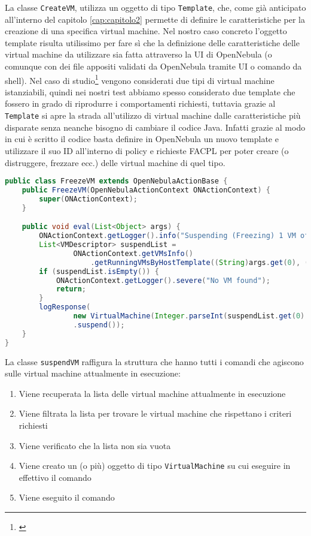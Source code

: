 La classe \texttt{CreateVM}, utilizza un oggetto di tipo \texttt{Template}, che, come già anticipato all'interno del capitolo \ref{cap:capitolo2} permette di definire le caratteristiche per la creazione di una specifica virtual machine. Nel nostro caso concreto l'oggetto template risulta utilissimo per fare sì che la definizione delle caratteristiche delle virtual machine da utilizzare sia fatta attraverso la UI di OpenNebula (o comunque con dei file appositi validati da OpenNebula tramite UI o comando da shell). Nel caso di studio\footnote{\cite{10.1007/978-3-319-08260-8_6}} vengono considerati due tipi di virtual machine istanziabili, quindi nei nostri test abbiamo spesso considerato due template che fossero in grado di riprodurre i comportamenti richiesti, tuttavia grazie al \texttt{Template} si apre la strada all'utilizzo di virtual machine dalle caratteristiche più disparate senza neanche bisogno di cambiare il codice Java. Infatti grazie al modo in cui è scritto il codice basta definire in OpenNebula un nuovo template e utilizzare il suo ID all'interno di policy e richieste FACPL per poter creare (o distruggere, frezzare ecc.) delle virtual machine di quel tipo.
\begin{lstlisting}[language=Java, caption=Classe per freezzare(sospendere) una \texttt{VirtualMachine}, label=code:FreezeVM, basicstyle=\fontsize{8.5}{9.5}\ttfamily]
public class FreezeVM extends OpenNebulaActionBase {
    public FreezeVM(OpenNebulaActionContext ONActionContext) {
        super(ONActionContext);
    }

    public void eval(List<Object> args) {
        ONActionContext.getLogger().info("Suspending (Freezing) 1 VM of [host, template]: " + "[" + args.get(0) + " " + args.get(2) + "]");
        List<VMDescriptor> suspendList = 
                ONActionContext.getVMsInfo()
                    .getRunningVMsByHostTemplate((String)args.get(0), (String)args.get(2));
        if (suspendList.isEmpty()) {
            ONActionContext.getLogger().severe("No VM found");
            return;
        }
        logResponse(
                new VirtualMachine(Integer.parseInt(suspendList.get(0).getVmId()), ONActionContext.getClient())
                .suspend());
    }
}
\end{lstlisting}
La classe \texttt{suspendVM} raffigura la struttura che hanno tutti i comandi che agiscono sulle virtual machine attualmente in esecuzione:
\begin{enumerate}
    \item Viene recuperata la lista delle virtual machine attualmente in esecuzione
    \item Viene filtrata la lista per trovare le virtual machine che rispettano i criteri richiesti
    \item Viene verificato che la lista non sia vuota
    \item Viene creato un (o più) oggetto di tipo \texttt{VirtualMachine} su cui eseguire in effettivo il comando
    \item Viene eseguito il comando
\end{enumerate}
